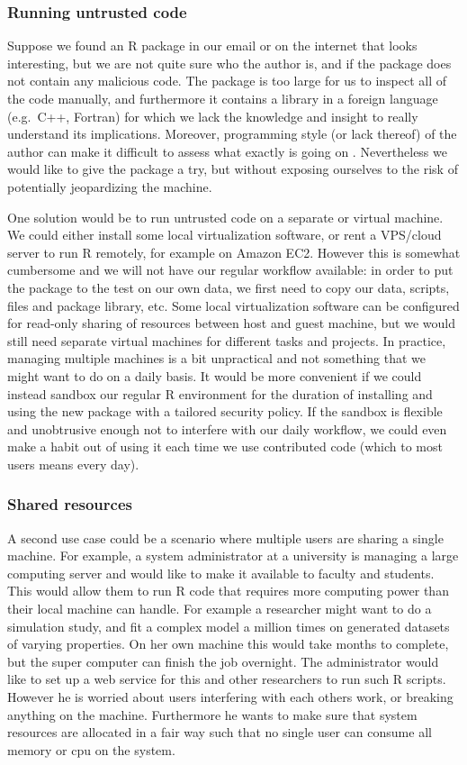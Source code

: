 \documentclass{jss}
\newcommand{\R}{\textsf{R}\xspace}
\newcommand{\Cpp}{\textsf{C++}\xspace}
\newcommand{\Fortran}{\textsf{Fortran}\xspace}
\begin{document}
\subsubsection{Running untrusted code}

Suppose we found an \R package in our email or on the internet that looks
interesting, but we are not quite sure who the author is, and if the package
does not contain any malicious code. The package is too large for us to inspect
all of the code manually, and furthermore it contains a library in a foreign
language (e.g.\ \Cpp, \Fortran) for which we lack the knowledge and insight to
really understand its implications. Moreover, programming style (or lack
thereof) of the author can make it difficult to assess what exactly is going on
\citep{ioccc}. Nevertheless we would like to give the package a try, but without
exposing ourselves to the risk of potentially jeopardizing the machine.

One solution would be to run untrusted code on a separate or virtual machine.
We could either install some local virtualization software, or rent a VPS/cloud
server to run R remotely, for example on Amazon EC2. However this is somewhat
cumbersome and we will not have our regular workflow available: in order to put
the package to the test on our own data, we first need to copy our data,
scripts, files and package library, etc. Some local virtualization software can
be configured for read-only sharing of resources between host and guest machine,
but we would still need separate virtual machines for different tasks and
projects. In practice, managing multiple machines is a bit unpractical and not
something that we might want to do on a daily basis. It would be more convenient
if we could instead sandbox our regular \R environment for the duration of
installing and using the new package with a tailored security policy. If the
sandbox is flexible and unobtrusive enough not to interfere with our daily
workflow, we could even make a habit out of using it each time we use
contributed code (which to most users means every day).

\subsubsection{Shared resources}

A second use case could be a scenario where multiple users are sharing a single
machine. For example, a system administrator at a university is managing a large
computing server and would like to make it available to faculty and students.
This would allow them to run \R code that requires more computing power than
their local machine can handle. For example a researcher might want to do a
simulation study, and fit a complex model a million times on generated datasets
of varying properties. On her own machine this would take months to complete,
but the super computer can finish the job overnight. The administrator would
like to set up a web service for this and other researchers to run such R
scripts. However he is worried about users interfering with each others work, or
breaking anything on the machine. Furthermore he wants to make sure that system
resources are allocated in a fair way such that no single user can consume all
memory or cpu on the system.
\end{document}
